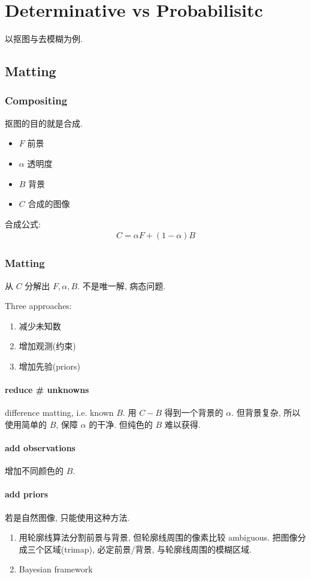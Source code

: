 \newpage
\section{Determinative vs Probabilisitc}
以抠图与去模糊为例.

\subsection{Matting}

\subsubsection{Compositing}
抠图的目的就是合成. 
\begin{itemize}
    \item $F$ 前景
    \item $\alpha$ 透明度
    \item $B$ 背景
    \item $C$ 合成的图像
\end{itemize}
合成公式:
\begin{align*}
    C= \alpha F+(1-\alpha )B
\end{align*}

\subsubsection{Matting}
从 $C$ 分解出 $F, \alpha, B$. 不是唯一解, 病态问题.

Three approaches:
\begin{enumerate}
    \item 减少未知数
    \item 增加观测(约束)
    \item 增加先验(priors)
\end{enumerate}

\paragraph{reduce \# unknowns} difference matting, i.e. known $B$. 用 $C-B$ 得到一个背景的 $\alpha$. 但背景复杂, 所以使用简单的 $B$, 保障 $\alpha$ 的干净. 但纯色的 $B$ 难以获得. 

\paragraph{add observations} 增加不同颜色的 $B$. 

\paragraph{add priors} 若是自然图像, 只能使用这种方法. 
\begin{enumerate}
    \item 用轮廓线算法分割前景与背景, 但轮廓线周围的像素比较 ambiguous. 把图像分成三个区域(trimap), 必定前景/背景, 与轮廓线周围的模糊区域. 
    \item Bayesian framework
\end{enumerate}

